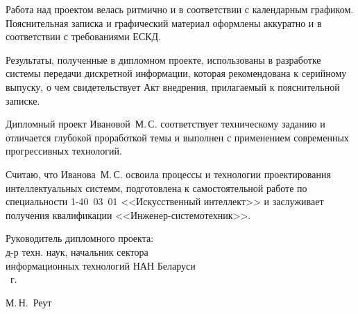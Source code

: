 \begin{singlespace}
{Работа над проектом велась ритмично и в соответствии с календарным графиком.
Пояснительная записка и графический материал оформлены аккуратно и в соответствии с требованиями ЕСКД.

Результаты, полученные в дипломном проекте, использованы в разработке системы передачи дискретной информации, которая рекомендована к серийному выпуску, о чем свидетельствует Акт внедрения, прилагаемый к пояснительной записке.

Дипломный проект Ивановой~М.\,С. соответствует техническому заданию и отличается глубокой проработкой темы и выполнен с применением современных прогрессивных технологий.

Считаю, что Иванова~М.\,С. освоила процессы и технологии проектирования интеллектуальных системм, подготовлена к самостоятельной работе по специальности 1-40~03~01
<<Искусственный интеллект>> и заслуживает получения квалификации <<Инженер-системотехник>>.

  \vfill
  \noindent
  \begin{minipage}{0.54\textwidth}
    \begin{flushleft}
      Руководитель дипломного проекта:\\
      д-р техн. наук, начальник сектора \\
      информационных технологий НАН Беларуси\\
      \underline{\hspace*{2em}} \underline{\hspace*{6.5em}} \the\year{}~г.
    \end{flushleft}
  \end{minipage}
  \begin{minipage}{0.44\textwidth}
    \begin{flushright}
      \underline{\hspace*{3cm}} М.\,Н.~Реут
    \end{flushright}
  \end{minipage}
}

\end{singlespace}


\clearpage